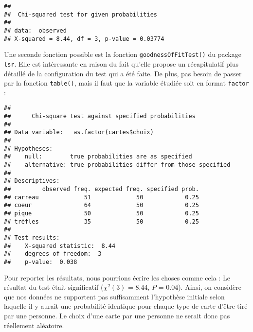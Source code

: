 \documentclass[
  french,
]{book}
\newenvironment{Shaded}{\begin{snugshade}}{\end{snugshade}}
\newcommand{\DataTypeTok}[1]{\textcolor[rgb]{0.13,0.29,0.53}{#1}}
\newcommand{\FloatTok}[1]{\textcolor[rgb]{0.00,0.00,0.81}{#1}}
\newcommand{\KeywordTok}[1]{\textcolor[rgb]{0.13,0.29,0.53}{\textbf{#1}}}
\newcommand{\NormalTok}[1]{#1}
\newcommand{\OperatorTok}[1]{\textcolor[rgb]{0.81,0.36,0.00}{\textbf{#1}}}
\begin{document}
\begin{verbatim}
## 
##  Chi-squared test for given probabilities
## 
## data:  observed
## X-squared = 8.44, df = 3, p-value = 0.03774
\end{verbatim}

Une seconde fonction possible est la fonction \texttt{goodnessOfFitTest()} du package \texttt{lsr}. Elle est intéressante en raison du fait qu'elle propose un récapitulatif plus détaillé de la configuration du test qui a été faite. De plus, pas besoin de passer par la fonction \texttt{table()}, mais il faut que la variable étudiée soit en format \texttt{factor} :

\begin{Shaded}
\end{Shaded}

\begin{verbatim}
## 
##      Chi-square test against specified probabilities
## 
## Data variable:   as.factor(cartes$choix) 
## 
## Hypotheses: 
##    null:        true probabilities are as specified
##    alternative: true probabilities differ from those specified
## 
## Descriptives: 
##         observed freq. expected freq. specified prob.
## carreau             51             50            0.25
## coeur               64             50            0.25
## pique               50             50            0.25
## trèfles             35             50            0.25
## 
## Test results: 
##    X-squared statistic:  8.44 
##    degrees of freedom:  3 
##    p-value:  0.038
\end{verbatim}

Pour reporter les résultats, nous pourrions écrire les choses comme cela \autocite{navarroLearningStatistics2018} : Le résultat du test était significatif (\(\chi^2(3)\) = 8.44, \(P\) = 0.04). Ainsi, on considère que nos données ne supportent pas suffisamment l'hypothèse initiale selon laquelle il y aurait une probabilité identique pour chaque type de carte d'être tiré par une personne. Le choix d'une carte par une personne ne serait donc pas réellement aléatoire.
\end{document}

